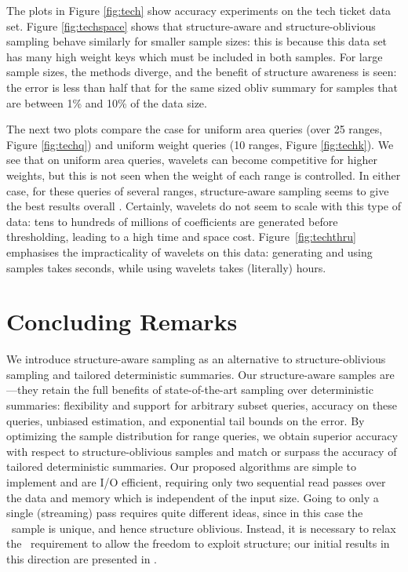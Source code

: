 \documentclass[11pt]{article}
\begin{document}
The plots in Figure \ref{fig:tech} show accuracy experiments
on the tech ticket data set. 
Figure \ref{fig:techspace} shows that
structure-aware and structure-oblivious sampling behave similarly for
smaller sample sizes: this is because this data set has many high
weight keys which must be included in both samples.
For large sample sizes, the methods diverge, and the benefit of
structure awareness is seen: the error is less than half that for the
same sized obliv summary for samples that are between 1\% and
10\% of the data size.  



The next two plots compare the case for uniform area queries 
(over 25 ranges, Figure \ref{fig:techq}) and uniform weight queries
(10 ranges, Figure \ref{fig:techk}).
We see that on uniform area queries, wavelets can become competitive
for higher weights, but this is not seen when the weight of each range
is controlled. 
In either case, for these queries of several ranges, structure-aware
sampling seems to give the best results overall . 
Certainly, wavelets do not seem to scale with this
type of data: tens to hundreds of millions of coefficients are
generated before thresholding, leading to a high time and space cost. 
Figure~\ref{fig:techthru} emphasises the impracticality of wavelets on
this data: generating and using samples takes seconds,
while using wavelets takes  (literally) hours. 




\section{Concluding Remarks}

We introduce structure-aware sampling as an alternative to
structure-oblivious sampling and tailored deterministic summaries. 
Our structure-aware samples are \varopt---they retain the full benefits
of state-of-the-art sampling over deterministic summaries: flexibility
and support for arbitrary subset queries, accuracy on these queries,
unbiased estimation, and exponential tail bounds on the error.  
By optimizing the sample distribution for range queries, we obtain
superior accuracy with respect to structure-oblivious samples and  
match or surpass the accuracy of tailored deterministic summaries.
Our proposed algorithms are simple to implement and are I/O
efficient, requiring only two sequential read passes over the data
and memory which is independent of the input size. 
Going to only a single (streaming) pass requires quite different
ideas, since in this case the \varopt\ sample is unique, and hence
structure oblivious. 
Instead, it is necessary to relax the \varopt\ requirement to allow
the freedom to exploit structure; our initial results in this
direction are presented in \cite{CCD:sigmetrics11}. 
\end{document}
